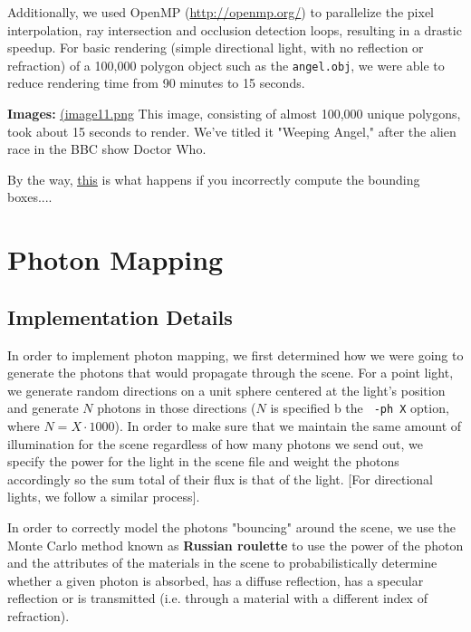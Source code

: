 \documentclass{article}
\begin{document}
Additionally, we used OpenMP (\url{http://openmp.org/}) to parallelize the pixel interpolation, ray intersection and occlusion detection loops, resulting in a drastic speedup. For basic rendering (simple directional light, with no reflection or refraction) of a 100,000 polygon object such as the \verb+angel.obj+, we were able to reduce rendering time from 90 minutes to 15 seconds.

\vspace{3mm}
{\bf Images:} \href{run://images/image11.png}{\underline{(image11.png}} This image, consisting of almost 100,000 unique polygons, took about 15 seconds to render. We've titled it "Weeping Angel," after the alien race in the BBC show Doctor Who.

By the way, \href{run://images/duude.png}{\underline{this}} is what happens if you incorrectly compute the bounding boxes....

\section{Photon Mapping} %
\label{sec:photonmapping}

\subsection{Implementation Details} %
\label{sub:implementationdetails}
In order to implement photon mapping, we first determined how we were going to generate the photons that would propagate through the scene. For a point light, we generate random directions on a unit sphere centered at the light's position and generate $N$ photons in those directions ($N$ is specified b the \verb+ -ph X+ option, where $N = X \cdot 1000$). In order to make sure that we maintain the same amount of illumination for the scene regardless of how many photons we send out, we specify the power for the light in the scene file and weight the photons accordingly so the sum total of their flux is that of the light. [For directional lights, we follow a similar process].

In order to correctly model the photons "bouncing" around the scene, we use the Monte Carlo method known as {\bf Russian roulette} to use the power of the photon and the attributes of the materials in the scene to probabilistically determine whether a given photon is absorbed, has a diffuse reflection, has a specular reflection or is transmitted (i.e. through a material with a different index of refraction).
\end{document}
